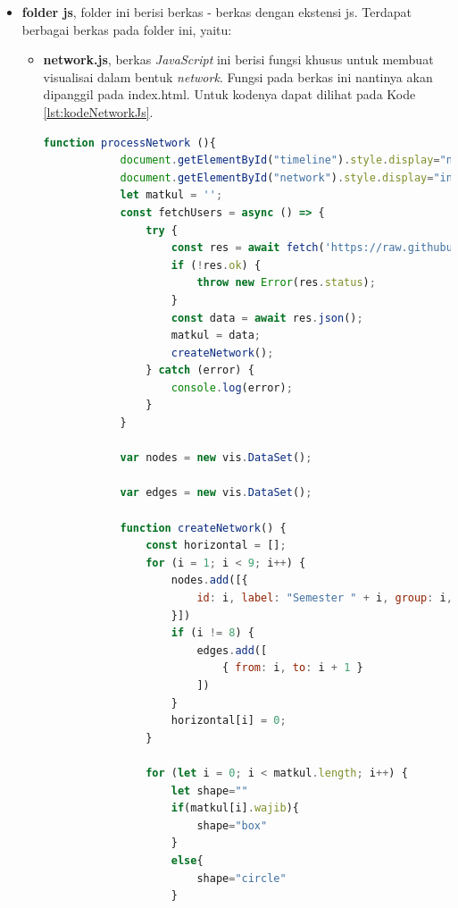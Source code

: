 \begin{itemize}
\begin{itemize}
        \item \textbf{vis.css}, berkas \textit{css} ini berfungsi untuk mengatur tampilan dan animasi untuk semua jenis visualisasi yang terdapat pada \textit{Vis.js}.
    \end{itemize}

    \item \textbf{folder js}, folder ini berisi berkas - berkas dengan ekstensi js. Terdapat berbagai berkas pada folder ini, yaitu:
    \begin{itemize}
        \item \textbf{network.js}, berkas \textit{JavaScript} ini berisi fungsi khusus untuk membuat visualisai dalam bentuk \textit{network}. Fungsi pada berkas ini nantinya akan dipanggil pada  index.html. Untuk kodenya dapat dilihat pada Kode \ref{lst:kodeNetworkJs}.
        
        \begin{lstlisting}[language=JavaScript, caption=Kode \textit{network.js}\label{lst:kodeNetworkJs}]
        function processNetwork (){
            document.getElementById("timeline").style.display="none"
            document.getElementById("network").style.display="inline"
            let matkul = '';
            const fetchUsers = async () => {
                try {
                    const res = await fetch('https://raw.githubusercontent.com/ftisunpar/data/master/prasyarat.json');
                    if (!res.ok) {
                        throw new Error(res.status);
                    }
                    const data = await res.json();
                    matkul = data;
                    createNetwork();
                } catch (error) {
                    console.log(error);
                }
            }
            
            var nodes = new vis.DataSet();
        
            var edges = new vis.DataSet();
        
            function createNetwork() {
                const horizontal = [];
                for (i = 1; i < 9; i++) {
                    nodes.add([{
                        id: i, label: "Semester " + i, group: i, y: i*150
                    }])
                    if (i != 8) {
                        edges.add([
                            { from: i, to: i + 1 }
                        ])
                    }
                    horizontal[i] = 0;
                }
                
                for (let i = 0; i < matkul.length; i++) {
                    let shape=""
                    if(matkul[i].wajib){
                        shape="box"
                    }
                    else{
                        shape="circle"
                    }
        

\end{lstlisting}
\end{itemize}
\end{itemize}
